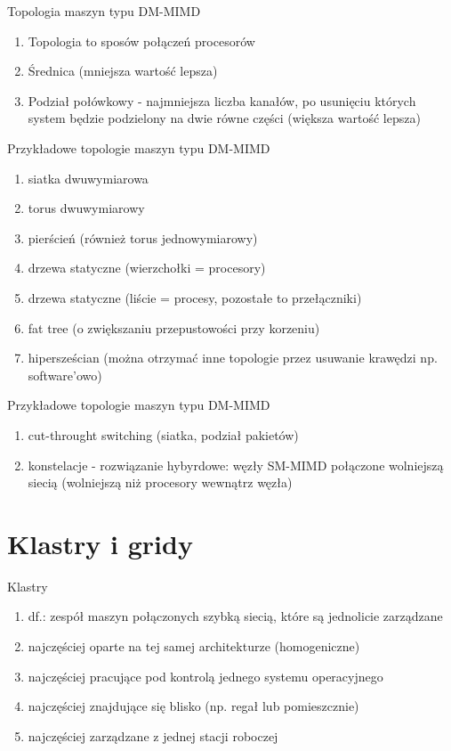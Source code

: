 \documentclass{beamer}
\begin{document}
\begin{frame}{Topologia maszyn typu DM-MIMD}
  \begin{enumerate}
  \item Topologia to sposów połączeń procesorów
  \item Średnica (mniejsza wartość lepsza)
  \item Podział połówkowy - najmniejsza liczba kanałów, po usunięciu których system będzie podzielony na dwie równe części (większa wartość lepsza)
  \end{enumerate}
\end{frame}

\begin{frame}{Przykładowe topologie maszyn typu DM-MIMD}
  \begin{enumerate}
  \item siatka dwuwymiarowa
  \item torus dwuwymiarowy
  \item pierścień (również torus jednowymiarowy)
  \item drzewa statyczne (wierzchołki = procesory)
  \item drzewa statyczne (liście = procesy, pozostałe to przełączniki)
  \item fat tree (o zwiększaniu przepustowości przy korzeniu)
  \item hipersześcian (można otrzymać inne topologie przez usuwanie krawędzi np. software'owo)
  \end{enumerate}
\end{frame}

\begin{frame}{Przykładowe topologie maszyn typu DM-MIMD}
  \begin{enumerate}
  \item cut-throught switching (siatka, podział pakietów)
  \item konstelacje - rozwiązanie hybyrdowe: węzły SM-MIMD połączone wolniejszą siecią (wolniejszą niż procesory wewnątrz węzła)
  \end{enumerate}
\end{frame}

\section{Klastry i gridy}

\begin{frame}{Klastry}
  \begin{enumerate}
  \item df.: zespół maszyn połączonych szybką siecią, które są jednolicie zarządzane
  \item najczęściej oparte na tej samej architekturze (homogeniczne)
  \item najczęściej pracujące pod kontrolą jednego systemu operacyjnego
  \item najczęściej znajdujące się blisko (np. regał lub pomieszcznie)
  \item najczęściej zarządzane z jednej stacji roboczej
  \end{enumerate}
\end{frame}
\end{document}
